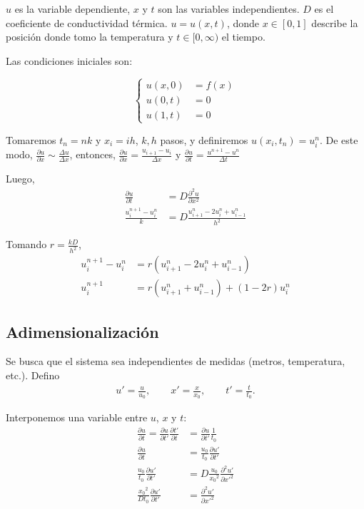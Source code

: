 \documentclass[a4paper]{article}
\begin{document}
$u$ es la variable dependiente, $x$ y $t$ son las variables independientes. $D$
es el coeficiente de conductividad térmica. $u = u(x, t)$, donde $x \in [0, 1]$
describe la posición donde tomo la temperatura y $t \in [0, \infty)$ el tiempo.

Las condiciones iniciales son:

\[
\begin{cases}
  u(x, 0) &= f(x) \\[6pt]
  u(0, t) &= 0    \\[6pt]
  u(1, t) &= 0
\end{cases}
\]

Tomaremos $t_n = nk$ y $x_i = ih$, $k, h$ pasos, y definiremos $u(x_i, t_n) = u^n_i$.
De este modo, $\frac{\partial u}{\partial x} \sim \frac{\Delta u}{\Delta x}$,
entonces, $\frac{\partial u}{\partial x} = \frac{u_{i+1} - u_i}{\Delta x}$ y
$\frac{\partial u}{\partial t} = \frac{u^{n+1} - u^n}{\Delta t}$


Luego,
\begin{align*}
  \frac{\partial u}{\partial t} &= D \frac{\partial^2 u}{\partial x^2} \\[6pt]
    \frac{u^{n+1}_i - u^n_i}{k} &= D \frac{u^n_{i+1} - 2u^n_i + u^n_{i-1}}{h^2}
\end{align*}

Tomando $r = \frac{kD}{h^2}$,
\begin{align*}
  u^{n+1}_i - u^n_i &= r(u^n_{i+1} - 2u^n_i + u^n_{i-1}) \\[6pt]
          u^{n+1}_i &= r(u^n_{i+1} + u^n_{i-1}) + (1 - 2r)u^n_i
\end{align*}


\subsection{Adimensionalización}

Se busca que el sistema sea independientes de medidas (metros, temperatura, etc.).
Defino
\begin{align*}
  u' = \frac{u}{u_0}, \quad\quad x' = \frac{x}{x_0}, \quad\quad t' = \frac{t}{t_0}.
\end{align*}

Interponemos una variable entre $u$, $x$ y $t$:
\begin{align*}
  \frac{\partial u}{\partial t} = \frac{\partial u}{\partial t'} \frac{\partial t'}{\partial t}
  &= \frac{\partial u}{\partial t'} \frac{1}{t_0} \\[6pt]
  \frac{\partial u}{\partial t} &= \frac{u_0}{t_0} \frac{\partial u'}{\partial t'} \\[6pt]
  \frac{u_0}{t_0} \frac{\partial u'}{\partial t'} &= D \frac{u_0}{{x_0}^2} \frac{\partial^2 u'}{\partial {x'}^2} \\[6pt]
  \frac{{x_0}^2}{D t_0} \frac{\partial u'}{\partial t'} &= \frac{\partial^2 u'}{\partial {x'}^2}
\end{align*}
\end{document}
